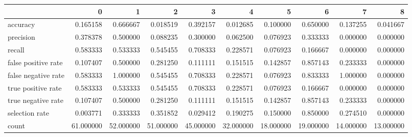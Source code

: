 \begin{tabular}{lrrrrrrrrr}
\toprule
{} &          0 &          1 &          2 &          3 &          4 &          5 &          6 &          7 &          8 \\
\midrule
accuracy            &   0.165158 &   0.666667 &   0.018519 &   0.392157 &   0.012685 &   0.100000 &   0.650000 &   0.137255 &   0.041667 \\
precision           &   0.378378 &   0.500000 &   0.088235 &   0.300000 &   0.062500 &   0.076923 &   0.333333 &   0.000000 &   0.000000 \\
recall              &   0.583333 &   0.533333 &   0.545455 &   0.708333 &   0.228571 &   0.076923 &   0.166667 &   0.000000 &   0.000000 \\
false positive rate &   0.107407 &   0.500000 &   0.281250 &   0.111111 &   0.151515 &   0.142857 &   0.857143 &   0.233333 &   0.000000 \\
false negative rate &   0.583333 &   1.000000 &   0.545455 &   0.708333 &   0.228571 &   0.076923 &   0.833333 &   1.000000 &   0.000000 \\
true positive rate  &   0.583333 &   0.533333 &   0.545455 &   0.708333 &   0.228571 &   0.076923 &   0.166667 &   0.000000 &   0.000000 \\
true negative rate  &   0.107407 &   0.500000 &   0.281250 &   0.111111 &   0.151515 &   0.142857 &   0.857143 &   0.233333 &   0.000000 \\
selection rate      &   0.003771 &   0.333333 &   0.351852 &   0.029412 &   0.190275 &   0.150000 &   0.850000 &   0.274510 &   0.000000 \\
count               &  61.000000 &  52.000000 &  51.000000 &  45.000000 &  32.000000 &  18.000000 &  19.000000 &  14.000000 &  13.000000 \\
\bottomrule
\end{tabular}
